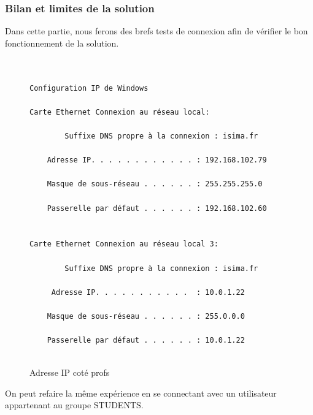 \subsubsection{Bilan et limites de la solution}

Dans cette partie, nous ferons des brefs tests de connexion afin de vérifier le bon fonctionnement de la solution.


\begin{figure}[H]
	\begin{center}
		\begin{minipage}{1\textwidth}
			\begin{lstlisting}[frame=trBL]


Configuration IP de Windows

Carte Ethernet Connexion au réseau local:

        Suffixe DNS propre à la connexion : isima.fr
        
	Adresse IP. . . . . . . . . . . . : 192.168.102.79
        
	Masque de sous-réseau . . . . . . : 255.255.255.0
        
	Passerelle par défaut . . . . . . : 192.168.102.60


Carte Ethernet Connexion au réseau local 3:

        Suffixe DNS propre à la connexion : isima.fr
       
	 Adresse IP. . . . . . . . . . .  : 10.0.1.22
        
	Masque de sous-réseau . . . . . . : 255.0.0.0
        
	Passerelle par défaut . . . . . . : 10.0.1.22


			\end{lstlisting}
		\end{minipage}
	\end{center}
	\caption{Adresse IP coté profs}
	\label{Adresse_IP_cote_profs}
\end{figure}


On peut refaire la même expérience en se connectant avec un utilisateur appartenant au groupe STUDENTS.

